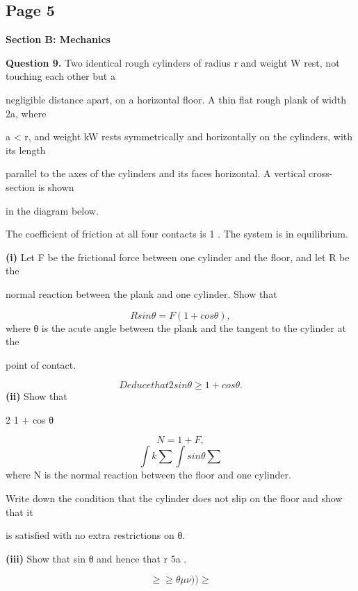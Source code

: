 \documentclass[12pt]{article}
\begin{document}
\subsection*{Page 5}
\begin{flushleft}
\bigskip\textbf{Section B: Mechanics}\par
\bigskip\textbf{Question 9.} Two identical rough cylinders of radius r and weight W rest, not touching each other but a\par
negligible distance apart, on a horizontal floor. A thin flat rough plank of width 2a, where\par
a < r, and weight kW rests symmetrically and horizontally on the cylinders, with its length\par
parallel to the axes of the cylinders and its faces horizontal. A vertical cross-section is shown\par
in the diagram below.\par
The coefficient of friction at all four contacts is 1 . The system is in equilibrium.\par
\textbf{(i)} Let F be the frictional force between one cylinder and the floor, and let R be the\par
normal reaction between the plank and one cylinder. Show that\par
\[R sin θ = F (1 + cos θ) ,\]
where θ is the acute angle between the plank and the tangent to the cylinder at the\par
point of contact.\par
\[Deduce that 2 sin θ \geq 1 + cos θ .\]
\textbf{(ii)} Show that\par
2 1 + cos θ\par
\[N = 1 + F ,\]
\[\int k \sum \int sin θ \sum\]
where N is the normal reaction between the floor and one cylinder.\par
Write down the condition that the cylinder does not slip on the floor and show that it\par
is satisfied with no extra restrictions on θ.\par
\textbf{(iii)} Show that sin θ  and hence that r \geq 5a .\par
\[\geq\geq\theta\mu\nu) ) \geq\]
\end{flushleft}
\end{document}
